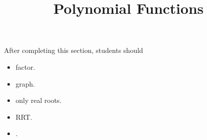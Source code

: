 \documentclass{ximera}
\title{Polynomial Functions}
\begin{document}
\begin{abstract}
\end{abstract}
\maketitle

\begin{sectionOutcomes}
After completing this section, students should 

\begin{itemize}
\item factor.
\item graph.
\item only real roots.
\item RRT.
\item .
\end{itemize}
\end{sectionOutcomes}
\end{document}
